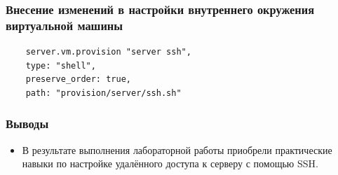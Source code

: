 \begin{frame}[fragile]
\frametitle{Внесение изменений в настройки внутреннего окружения виртуальной машины}
\begin{verbatim}
    server.vm.provision "server ssh",
    type: "shell",
    preserve_order: true,
    path: "provision/server/ssh.sh"
\end{verbatim}
\end{frame}

\begin{frame}
\frametitle{Выводы}
\begin{itemize}
    \item В результате выполнения лабораторной работы приобрели практические навыки по настройке удалённого доступа к серверу с помощью SSH.
\end{itemize}
\end{frame}

